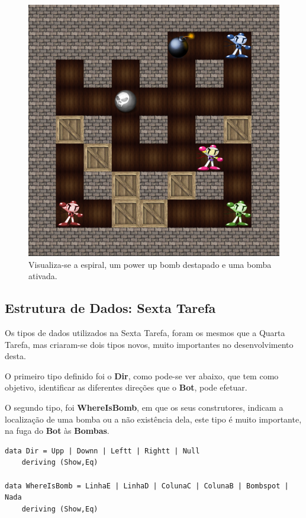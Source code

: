 \documentclass[4apaper]{report}
\begin{document}
\begin{figure}[ht]
	\centering
	\includegraphics[scale=0.45]{2.jpg}
	\caption{Visualiza-se a espiral, um power up bomb destapado e uma bomba ativada.}
	\label{img3:2T5}
\end{figure}

\subsection{Estrutura de Dados: Sexta Tarefa}

Os tipos de dados utilizados na Sexta Tarefa, foram os mesmos que a Quarta Tarefa, mas criaram-se dois tipos novos, muito importantes no desenvolvimento desta. 

O primeiro tipo definido foi o \textbf{Dir}, como pode-se ver abaixo, que tem como objetivo, identificar as diferentes direções que o \textbf{Bot}, pode efetuar. 

O segundo tipo, foi \textbf{WhereIsBomb}, em que os seus construtores, indicam a localização de uma bomba ou a não existência dela, este tipo é muito importante, na fuga do \textbf{Bot} às \textbf{Bombas}.

\begin{verbatim}
data Dir = Upp | Downn | Leftt | Rightt | Null
    deriving (Show,Eq)

data WhereIsBomb = LinhaE | LinhaD | ColunaC | ColunaB | Bombspot | Nada
    deriving (Show,Eq)
\end{verbatim}
\end{document}
